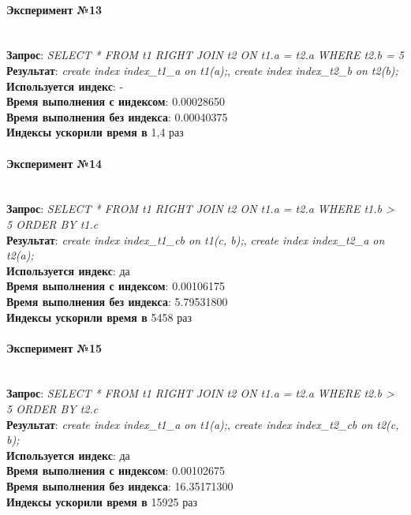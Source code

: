 \paragraph{Эксперимент №13}\\
\textbf{Запрос}: \textit{SELECT * FROM t1 RIGHT JOIN t2 ON t1.a = t2.a WHERE t2.b = 5}\\
\textbf{Результат}: \textit{create index index_t1_a on t1(a);}, \textit{create index index_t2_b on t2(b);}\\
\textbf{Используется индекс}: -\\
\textbf{Время выполнения с индексом}: 0.00028650\\
\textbf{Время выполнения без индекса}: 0.00040375\\
\textbf{Индексы ускорили время в} 1,4 раз\\

\paragraph{Эксперимент №14}\\
\textbf{Запрос}: \textit{SELECT * FROM t1 RIGHT JOIN t2 ON t1.a = t2.a WHERE t1.b > 5 ORDER BY t1.c}\\
\textbf{Результат}: \textit{create index index_t1_cb on t1(c, b);}, \textit{create index index_t2_a on t2(a);}\\
\textbf{Используется индекс}: да\\
\textbf{Время выполнения с индексом}: 0.00106175\\
\textbf{Время выполнения без индекса}: 5.79531800\\
\textbf{Индексы ускорили время в} 5458 раз\\

\paragraph{Эксперимент №15}\\
\textbf{Запрос}: \textit{SELECT * FROM t1 RIGHT JOIN t2 ON t1.a = t2.a WHERE t2.b > 5 ORDER BY t2.c}\\
\textbf{Результат}: \textit{create index index_t1_a on t1(a);}, \textit{create index index_t2_cb on t2(c, b);}\\
\textbf{Используется индекс}: да\\
\textbf{Время выполнения с индексом}: 0.00102675\\
\textbf{Время выполнения без индекса}: 16.35171300\\
\textbf{Индексы ускорили время в} 15925 раз\\


